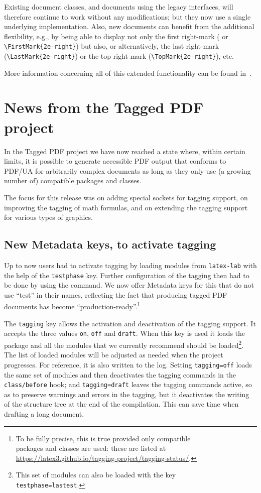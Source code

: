 \documentclass{ltnews}
\begin{document}
Existing document classes, and documents using the legacy interfaces,
will therefore continue to work without any modifications; but they
now use a single underlying implementation. Also, new documents can
benefit from the additional flexibility, e.g., by being able to
display not only the first right-mark ( or
\verb=\FirstMark{2e-right}=) but also, or alternatively, the last
right-mark (\verb=\LastMark{2e-right}=) or the top right-mark
(\verb=\TopMark{2e-right}=), etc.

More information concerning all of this extended functionality can be
found in~\cite{41:ltmarks}.


\section{News from the Tagged PDF project}

In the Tagged PDF project we have now reached a state where, within
certain limits, it is possible to generate accessible PDF output that
conforms to PDF/UA for arbitrarily complex documents as long as they
only use (a growing number of) compatible packages and classes.

The focus for this release was on adding special sockets for tagging
support, on improving the tagging of math formulas, and on extending
the tagging support for various types of graphics.

\subsection{New Metadata keys, to activate tagging}

Up to now users had to activate tagging by loading modules from
\texttt{latex-lab} with the help of the \texttt{testphase}
key. Further configuration of the tagging then had to be done by using
the  command.  We now offer Metadata keys for this
that do not use \enquote{test} in their names, reflecting the fact
that producing tagged PDF documents has become
\enquote{production-ready}.\footnote{To be fully precise, this is true
provided only compatible\\
packages and classes are used: these are listed at\\
\url{https://latex3.github.io/tagging-project/tagging-status/}.}

The \texttt{tagging} key allows the activation and deactivation of the
tagging support.  It accepts the three values \texttt{on},
\texttt{off} and \texttt{draft}.  When this key is used it loads the
 package and all the modules that we currently recommend 
should be loaded\footnote{This set of modules can also be loaded with 
the key\\ \texttt{testphase=lastest}.}. 
The list of loaded modules will be adjusted as needed when
the project progresses. For reference, it is also written to the log.
Setting \texttt{tagging=off} loads the 
same set of modules and then
deactivates the tagging commands in the \texttt{class/before} hook;
and \texttt{tagging=draft} leaves the tagging commands active, so as
to preserve warnings and errors in the tagging, but it deactivates the
writing of the structure tree at the end of the compilation. This can
save time when drafting a long document.
\end{document}
